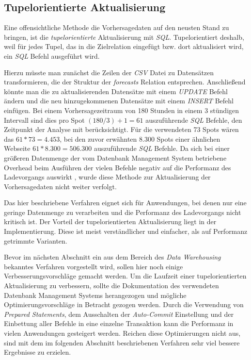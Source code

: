 \subsection{Tupelorientierte Aktualisierung}
Eine offensichtliche Methode die Vorhersagedaten auf den neusten Stand
zu bringen, ist die \textit{tupelorientierte} Aktualisierung mit
\textit{SQL}. Tupelorientiert deshalb, weil für jedes Tupel, das in
die Zielrelation eingefügt bzw. dort aktualisiert wird, ein
\textit{SQL} Befehl ausgeführt wird.

Hierzu müsste man zunächst die Zeilen der \textit{CSV} Datei zu
Datensätzen transformieren, die der Struktur der \textit{forecasts}
Relation entsprechen. Anschließend könnte man die zu aktualisierenden
Datensätze mit einem \textit{UPDATE} Befehl ändern und die neu
hinzugekommenen Datensätze mit einem \textit{INSERT} Befehl
einfügen. Bei einem Vorhersagezeitraum von 180 Stunden in einem 3
stündigen Intervall sind dies pro Spot $(180 / 3) + 1 = 61$
auszuführende \textit{SQL} Befehle, den Zeitpunkt der Analyse mit
berücksichtigt. Für die verwendeten 73 Spots wären das $61 * 73 =
4.453$, bei den zuvor erwähnten 8.300 Spots einer ähnlichen Webseite
$61 * 8.300 = 506.300$ auszuführende \textit{SQL} Befehle. Da sich bei
einer größeren Datenmenge der vom Datenbank Management System
betriebene Overhead beim Ausführen der vielen Befehle negativ auf die
Performanz des Ladevorgangs auswirkt \cite{postgresql:populate}, wurde
diese Methode zur Aktualisierung der Vorhersagedaten nicht weiter
verfolgt.

Das hier beschriebene Verfahren eignet sich für Anwendungen, bei denen
nur eine geringe Datenmenge zu verarbeiten und die Performanz des
Ladevorgangs nicht kritisch ist. Der Vorteil der tupelorientierten
Aktualisierung liegt in der Implementierung. Diese ist meist
verständlicher und einfacher, als auf Performanz getrimmte Varianten.

Bevor im nächsten Abschnitt ein aus dem Bereich des \textit{Data
  Warehousing} bekanntes Verfahren vorgestellt wird, sollen hier noch
einige Verbesserungsvorschläge gemacht werden. Um die Laufzeit einer
tupelorientierten Aktualisierung zu verbessern, sollte die
Dokumentation des verwendeten Datenbank Management Systems
herangezogen und mögliche Optimierungsvorschläge in Betracht gezogen
werden. Durch die Verwendung von \textit{Prepared Statements}, dem
Ausschalten der \textit{Auto-Commit} Einstellung und der Einbettung
aller Befehle in eine einzelne Transaktion kann die Performanz in
vielen Anwendungen gesteigert werden. Reichen diese Optimierungen
nicht aus, sind mit dem im folgenden Abschnitt beschriebenen Verfahren
sehr viel bessere Ergebnisse zu erzielen.

